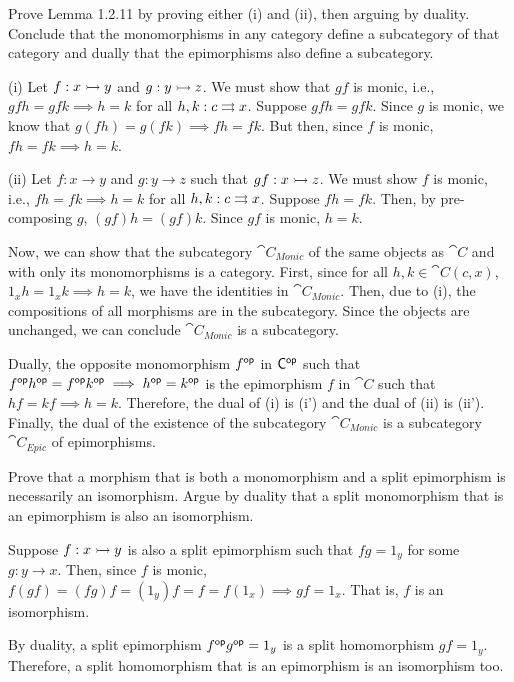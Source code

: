 \documentclass[notes,tikz]{agony}
\renewcommand{\C}{\cat{C}}
\begin{document}
\begin{xca}
  Prove Lemma 1.2.11 by proving either (i) and (ii), then arguing by duality.
  Conclude that the monomorphisms in any category define a subcategory of that category
  and dually that the epimorphisms also define a subcategory.
\end{xca}
\begin{prf}
  (i) Let $f : x \rightarrowtail y$ and $g : y \rightarrowtail z$.
  We must show that $gf$ is monic, i.e.,
  $gfh = gfk \implies h = k$ for all $h,k : c \rightrightarrows x$.
  Suppose $gfh = gfk$.
  Since $g$ is monic, we know that $g(fh) = g(fk) \implies fh = fk$.
  But then, since $f$ is monic, $fh = fk \implies h = k$.

  (ii) Let $f : x \to y$ and $g : y \to z$ such that $gf : x \rightarrowtail z$.
  We must show $f$ is monic, i.e., $fh = fk \implies h = k$ for all $h,k : c \rightrightarrows x$.
  Suppose $fh = fk$.
  Then, by pre-composing $g$, $(gf)h = (gf)k$.
  Since $gf$ is monic, $h = k$.

  Now, we can show that the subcategory $\cat{C_{Monic}}$ of the same objects
  as $\C$ and with only its monomorphisms is a category.
  First, since for all $h,k \in \C(c,x)$,
  $1_xh = 1_xk \implies h = k$, we have the identities in $\cat{C_{Monic}}$.
  Then, due to (i), the compositions of all morphisms are in the subcategory.
  Since the objects are unchanged, we can conclude $\cat{C_{Monic}}$ is a subcategory.

  Dually, the opposite monomorphism $f^{\mathsf{op}}$ in $\C\op$ such that
  $f^{\mathsf{op}} h^{\mathsf{op}} = f^{\mathsf{op}} k^{\mathsf{op}} \implies h^{\mathsf{op}} = k^{\mathsf{op}}$ is the epimorphism
  $f$ in $\C$ such that $hf = kf \implies h = k$.
  Therefore, the dual of (i) is (i') and the dual of (ii) is (ii').
  Finally, the dual of the existence of the subcategory $\cat{C_{Monic}}$
  is a subcategory $\cat{C_{Epic}}$ of epimorphisms.
\end{prf}

\begin{xca}
  Prove that a morphism that is both a monomorphism
  and a split epimorphism is necessarily an isomorphism.
  Argue by duality that a split monomorphism that is
  an epimorphism is also an isomorphism.
\end{xca}
\begin{prf}
  Suppose $f : x \rightarrowtail y$ is also a split epimorphism such that $fg = 1_y$ for some $g : y \to x$.
  Then, since $f$ is monic, $f(gf) = (fg)f = (1_y)f = f = f(1_x) \implies gf = 1_x$.
  That is, $f$ is an isomorphism.

  By duality, a split epimorphism $f^{\mathsf{op}} g^{\mathsf{op}} = 1_y$ is a split homomorphism $gf = 1_y$.
  Therefore, a split homomorphism that is an epimorphism is an isomorphism too.
\end{prf}
\end{document}
